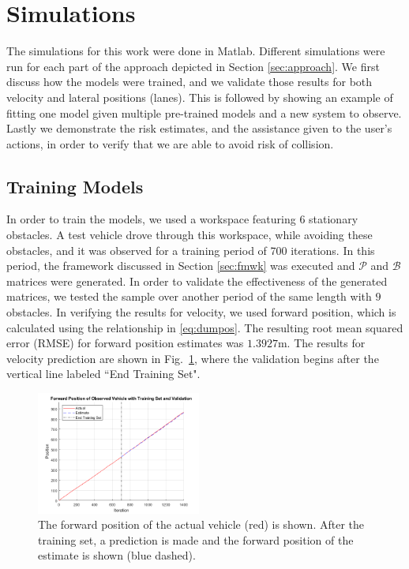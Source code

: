 \documentclass[letterpaper, 10 pt, conference]{ieeeconf}  %
\begin{document}
\section{Simulations} \label{sec:sims}
The simulations for this work were done in Matlab. Different simulations were run for each part of the approach depicted in Section \ref{sec:approach}. We first discuss how the models were trained, and we validate those results for both velocity and lateral positions (lanes). This is followed by showing an example of fitting one model given multiple pre-trained models and a new system to observe. Lastly we demonstrate the risk estimates, and the assistance given to the user's actions, in order to verify that we are able to avoid risk of collision.

\subsection{Training Models}
In order to train the models, we used a workspace featuring $6$ stationary obstacles. A test vehicle drove through this workspace, while avoiding these obstacles, and it was observed for a training period of 700 iterations. In this period, the framework discussed in Section \ref{sec:fmwk} was executed and $\mathcal P$ and $\mathcal B$ matrices were generated. In order to validate the effectiveness of the generated matrices, we tested the sample over another period of the same length with $9$ obstacles. In verifying the results for velocity, we used forward position, which is calculated using the relationship in \eqref{eq:dumpos}. The resulting root mean squared error (RMSE) for forward position estimates was $1.3927$m. The results for velocity prediction are shown in Fig.~\ref{fig:train1}, where the validation begins after the vertical line labeled ``End Training Set". 

\begin{figure}[ht]
\includegraphics[width=0.48\textwidth]{fig/train1.png}
\caption{The forward position of the actual vehicle (red) is shown. After the training set, a prediction is made and the forward position of the estimate is shown (blue dashed).} \label{fig:train1}
\end{figure}
\end{document}
